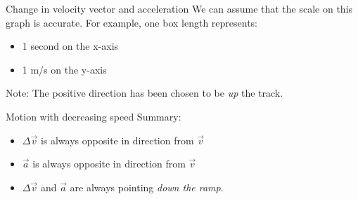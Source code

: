 \documentclass{beamer}
\begin{document}
\begin{frame}
  {Change in velocity vector and acceleration}
  We can assume that the scale on this graph is accurate. For example, one box length
  represents:
  \begin{itemize}
    \item 1 second on the x-axis
    \item 1 m/s on the y-axis
  \end{itemize}
  \begin{center}
    
    Note: The positive direction has been chosen to be \textit{up} the track.
  \end{center}
\end{frame}

\begin{frame}
  {Motion with decreasing speed}
  Summary:
  \begin{itemize}
    \item $\Delta\vec{v}$ is always opposite in direction from $\vec{v}$
    \item $\vec{a}$ is always opposite in direction from $\vec{v}$
    \item $\Delta\vec{v}$ and $\vec{a}$ are always pointing \textit{down the ramp}.
  \end{itemize}
\end{frame}
\end{document}
